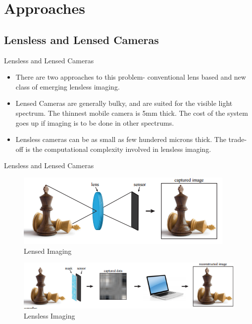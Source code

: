 \documentclass{beamer}
\begin{document}
\section{Approaches}
\subsection[]{Lensless and Lensed Cameras}
\begin{frame}{Lensless and Lensed Cameras}
\begin{itemize}
\item There are two approaches to this problem- conventional lens based and new class of emerging lensless imaging.
 \item Lensed Cameras are generally bulky, and are suited for the visible light spectrum. The thinnest mobile camera is 5mm thick. The cost of the system goes up if imaging is to be done in  other spectrums.
 \item Lensless cameras can be as small as few hundered microns thick. The trade-off is the computational complexity involved in lensless imaging.
\end{itemize}
\end{frame}
\begin{frame}{Lensless and Lensed Cameras}

\begin{figure}
\centering
\includegraphics[scale=0.5]{doc_images/lensless_1.PNG}
\caption{Lensed Imaging}
\end{figure}
\begin{figure}
\centering
\includegraphics[scale=0.5]{doc_images/lensless_2.PNG}
\caption{Lensless Imaging}
\end{figure}
\end{frame}
\end{document}
